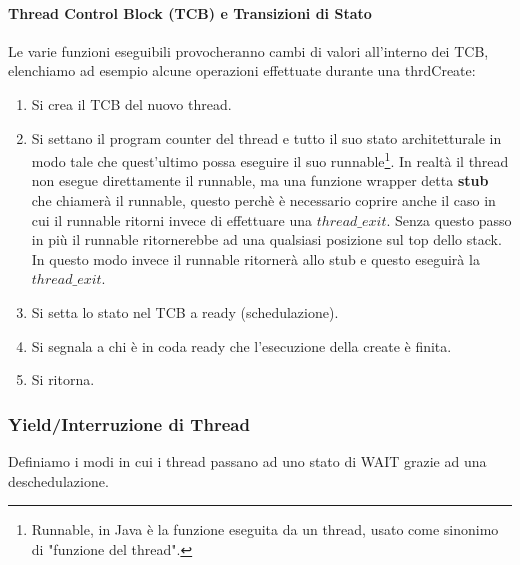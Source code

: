 \documentclass{article}
\begin{document}
\paragraph{Thread Control Block (TCB) e Transizioni di Stato} Le varie funzioni eseguibili provocheranno cambi di valori all'interno dei TCB, elenchiamo ad esempio alcune operazioni effettuate durante
una thrdCreate:

\begin{enumerate}
    \item Si crea il TCB del nuovo thread.
    \item Si settano il program counter del thread e tutto il suo stato architetturale in modo tale che quest'ultimo possa eseguire il suo runnable\footnote{Runnable, in Java è la funzione eseguita da un thread, usato come sinonimo di "funzione del thread".}. 
    In realtà il thread non esegue direttamente il runnable, ma una funzione wrapper detta \textbf{stub} che chiamerà il runnable,
    questo perchè è necessario coprire anche il caso in cui il runnable ritorni invece di effettuare una $thread\_exit$. Senza questo passo in più
    il runnable ritornerebbe ad una qualsiasi posizione sul top dello stack. In questo modo invece il runnable ritornerà allo stub e questo eseguirà la $thread\_exit$.
    \item Si setta lo stato nel TCB a ready (schedulazione).
    \item Si segnala a chi è in coda ready che l'esecuzione della create è finita.
    \item Si ritorna.
\end{enumerate} 

\newpage

\subsubsection{Yield/Interruzione di Thread}

Definiamo i modi in cui i thread passano ad uno stato di WAIT grazie ad una deschedulazione.
\end{document}
